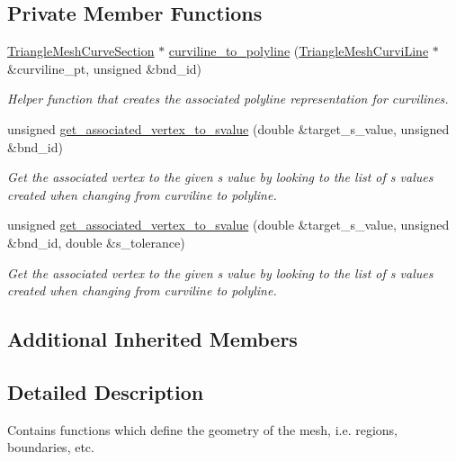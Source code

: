 \subsection*{Private Member Functions}
\begin{DoxyCompactItemize}
\item 
\hyperlink{classoomph_1_1TriangleMeshCurveSection}{Triangle\+Mesh\+Curve\+Section} $\ast$ \hyperlink{classoomph_1_1UnstructuredTwoDMeshGeometryBase_ae0287b88002273bb17ebcc5b3a25776a}{curviline\+\_\+to\+\_\+polyline} (\hyperlink{classoomph_1_1TriangleMeshCurviLine}{Triangle\+Mesh\+Curvi\+Line} $\ast$\&curviline\+\_\+pt, unsigned \&bnd\+\_\+id)
\begin{DoxyCompactList}\small\item\em Helper function that creates the associated polyline representation for curvilines. \end{DoxyCompactList}\item 
unsigned \hyperlink{classoomph_1_1UnstructuredTwoDMeshGeometryBase_a8f1cbe4c85634fc1bc7141ad3d2e973f}{get\+\_\+associated\+\_\+vertex\+\_\+to\+\_\+svalue} (double \&target\+\_\+s\+\_\+value, unsigned \&bnd\+\_\+id)
\begin{DoxyCompactList}\small\item\em Get the associated vertex to the given s value by looking to the list of s values created when changing from curviline to polyline. \end{DoxyCompactList}\item 
unsigned \hyperlink{classoomph_1_1UnstructuredTwoDMeshGeometryBase_abb5c8ca1b64f62215f860b03990acd16}{get\+\_\+associated\+\_\+vertex\+\_\+to\+\_\+svalue} (double \&target\+\_\+s\+\_\+value, unsigned \&bnd\+\_\+id, double \&s\+\_\+tolerance)
\begin{DoxyCompactList}\small\item\em Get the associated vertex to the given s value by looking to the list of s values created when changing from curviline to polyline. \end{DoxyCompactList}\end{DoxyCompactItemize}
\subsection*{Additional Inherited Members}


\subsection{Detailed Description}
Contains functions which define the geometry of the mesh, i.\+e. regions, boundaries, etc. 

